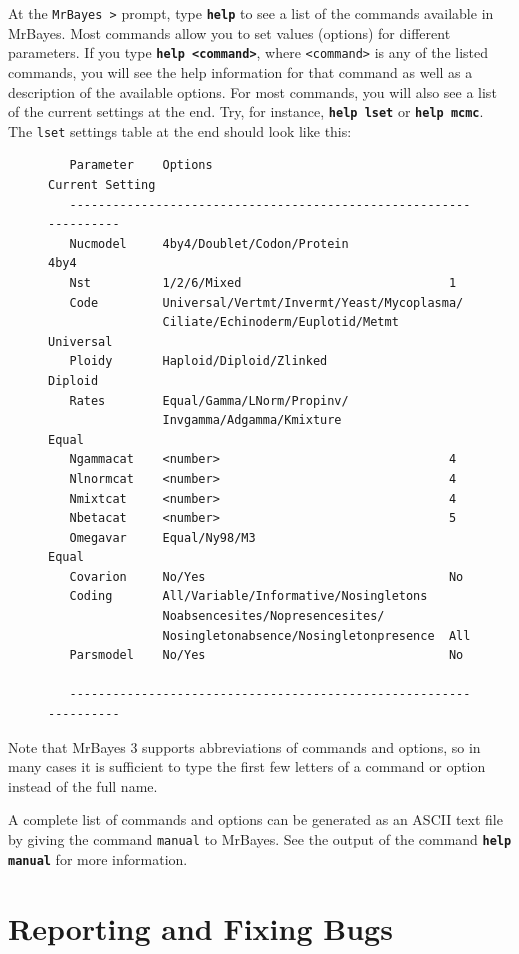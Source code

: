 \documentclass[12pt]{book}
\newcommand{\ttt}[1]{\texttt{#1}}
\newcommand{\tb}[1]{\ttt{\textbf{#1}}}
\begin{document}
At the \ttt{MrBayes >} prompt, type \tb{help} to see a list of the commands available in MrBayes.
Most commands allow you to set values (options) for different parameters. If you type \tb{help
<command>}, where \ttt{<command>} is any of the listed commands, you will see the help information
for that command as well as a description of the available options. For most commands, you will
also see a list of the current settings at the end. Try, for instance, \tb{help lset} or \tb{help
mcmc}. The \ttt{lset} settings table at the end should look like this:

\begin{figure}[h]\singlespacing\footnotesize
\begin{verbatim}
   Parameter    Options                               Current Setting
   ------------------------------------------------------------------
   Nucmodel     4by4/Doublet/Codon/Protein              4by4
   Nst          1/2/6/Mixed                             1
   Code         Universal/Vertmt/Invermt/Yeast/Mycoplasma/
                Ciliate/Echinoderm/Euplotid/Metmt       Universal
   Ploidy       Haploid/Diploid/Zlinked                 Diploid
   Rates        Equal/Gamma/LNorm/Propinv/
                Invgamma/Adgamma/Kmixture               Equal
   Ngammacat    <number>                                4
   Nlnormcat    <number>                                4
   Nmixtcat     <number>                                4
   Nbetacat     <number>                                5
   Omegavar     Equal/Ny98/M3                           Equal
   Covarion     No/Yes                                  No
   Coding       All/Variable/Informative/Nosingletons
                Noabsencesites/Nopresencesites/
                Nosingletonabsence/Nosingletonpresence  All
   Parsmodel    No/Yes                                  No

   ------------------------------------------------------------------
\end{verbatim}\end{figure}

Note that MrBayes 3 supports abbreviations of commands and options, so in many cases it is
sufficient to type the first few letters of a command or option instead of the full name.

A complete list of commands and options can be generated as an ASCII text file by giving the
command \ttt{manual} to MrBayes. See the output of the command \tb{help manual} for more
information.

\section{Reporting and Fixing Bugs}
\end{document}
